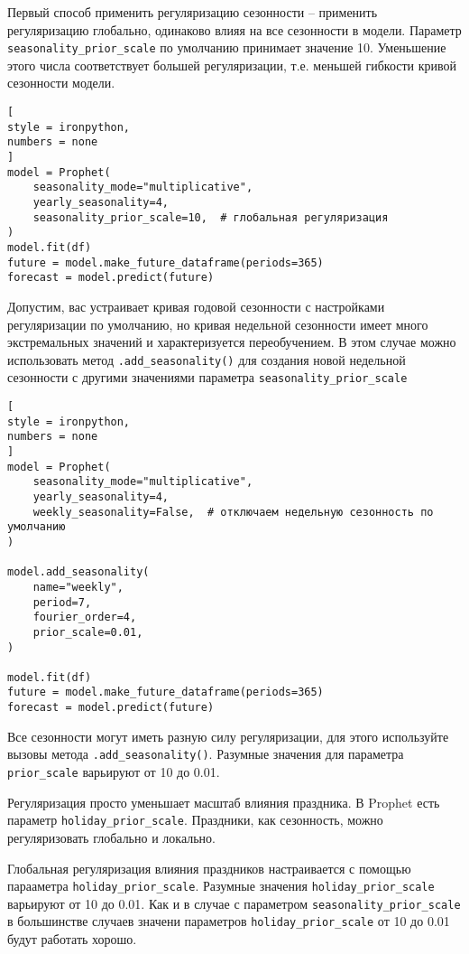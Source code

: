\documentclass[%
	11pt,
	a4paper,
	utf8,
		]{article}
\begin{document}
Первый способ применить регуляризацию сезонности -- применить регуляризацию глобально, одинаково влияя на все сезонности в модели. Параметр \verb|seasonality_prior_scale| по умолчанию принимает значение 10. Уменьшение этого числа соответствует большей регуляризации, т.е. меньшей гибкости кривой сезонности модели.
\begin{lstlisting}[
style = ironpython,
numbers = none
]
model = Prophet(
    seasonality_mode="multiplicative",
    yearly_seasonality=4,
    seasonality_prior_scale=10,  # глобальная регуляризация
)
model.fit(df)
future = model.make_future_dataframe(periods=365)
forecast = model.predict(future)
\end{lstlisting}

Допустим, вас устраивает кривая годовой сезонности с настройками регуляризации по умолчанию, но кривая недельной сезонности имеет много экстремальных значений и характеризуется переобучением. В этом случае можно использовать метод \verb|.add_seasonality()| для создания новой недельной сезонности с другими значениями параметра \verb|seasonality_prior_scale|
\begin{lstlisting}[
style = ironpython,
numbers = none
]
model = Prophet(
    seasonality_mode="multiplicative",
    yearly_seasonality=4,
    weekly_seasonality=False,  # отключаем недельную сезонность по умолчанию
)

model.add_seasonality(
    name="weekly",
    period=7,
    fourier_order=4,
    prior_scale=0.01,
)

model.fit(df)
future = model.make_future_dataframe(periods=365)
forecast = model.predict(future)
\end{lstlisting}

Все сезонности могут иметь разную силу регуляризации, для этого используйте вызовы метода \verb|.add_seasonality()|. Разумные значения для параметра \verb|prior_scale| варьируют от 10 до 0.01.

Регуляризация просто уменьшает масштаб влияния праздника. В Prophet есть параметр \verb|holiday_prior_scale|. Праздники, как сезонность, можно регуляризовать глобально и локально.

Глобальная регуляризация влияния праздников настраивается с помощью парааметра \verb|holiday_prior_scale|. Разумные значения \verb|holiday_prior_scale| варьируют от 10 до 0.01. Как и в случае с параметром \verb|seasonality_prior_scale| в большинстве случаев значени параметров \verb|holiday_prior_scale| от 10 до 0.01 будут работать хорошо. 
\end{document}
